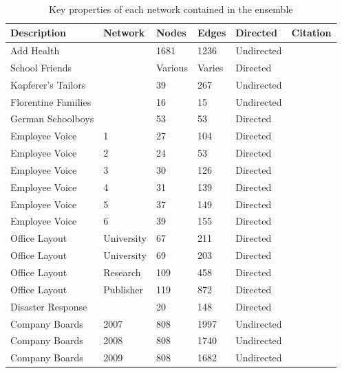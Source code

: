 \documentclass[
]{statsoc}
\begin{document}
\begin{table}
\caption{\label{tab:network_summaries} Key properties of each network contained in the ensemble}\\
\begin{tabular}[t]{lllllr}
\toprule
Description & Network & Nodes & Edges & Directed  & Citation\\
\midrule
\rowcolor{gray!6}  Add Health &  & 1681 & 1236 & Undirected &  \cite{AddHealth2007}\\
\addlinespace
School Friends &  & Various & Varies & Directed &  \cite{Lubbers2007}\\
\rowcolor{gray!6}  Kapferer's Tailors &  & 39 & 267 & Undirected &  \cite{Robins2007}\\
\addlinespace
Florentine Families &  & 16 & 15 & Undirected &  \cite{Robins2007}\\
\rowcolor{gray!6}  German Schoolboys &  & 53 & 53 & Directed & \cite{Heidler2014}\\
\addlinespace
Employee Voice & 1 & 27 & 104 & Directed & \cite{Pauksktat2011}\\
\rowcolor{gray!6}  Employee Voice & 2 & 24 & 53 & Directed &  \cite{Pauksktat2011}\\
Employee Voice & 3 & 30 & 126 & Directed &  \cite{Pauksktat2011}\\
\rowcolor{gray!6}  Employee Voice & 4 & 31 & 139 & Directed &  \cite{Pauksktat2011}\\
Employee Voice & 5 & 37 & 149 & Directed &  \cite{Pauksktat2011}\\
\rowcolor{gray!6}  Employee Voice & 6 & 39 & 155 & Directed & \cite{Pauksktat2011}\\
\addlinespace
Office Layout & University & 67 & 211 & Directed & \cite{Sailer2012}\\
\rowcolor{gray!6}  Office Layout & University & 69 & 203 & Directed & \cite{Sailer2012}\\
Office Layout & Research & 109 & 458 & Directed & \cite{Sailer2012}\\
\rowcolor{gray!6}  Office Layout & Publisher & 119 & 872 & Directed & \cite{Sailer2012}\\
\addlinespace
Disaster Response &  & 20 & 148 & Directed & \cite{Doreian2012}\\
\addlinespace
\rowcolor{gray!6}  Company Boards & 2007 & 808 & 1997 & Undirected & \cite{Gygax2015}\\
Company Boards & 2008 & 808 & 1740 & Undirected & \cite{Gygax2015}\\
\rowcolor{gray!6}  Company Boards & 2009 & 808 & 1682 & Undirected & \cite{Gygax2015}\\

\end{tabular}
\end{table}
\end{document}
